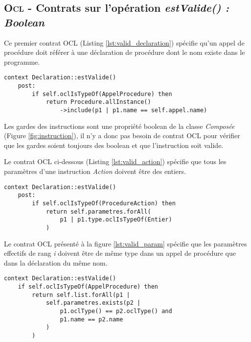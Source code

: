 
\subsection{\textsc{Ocl} - Contrats sur l'opération \emph{estValide() : Boolean}}
\label{sec:question14}

Ce premier contrat OCL (Listing \ref{lst:valid_declaration}) spécifie qu'un appel de procédure doit référer à une déclaration de procédure dont le nom existe dans le programme.

\begin{lstlisting}[caption=Contrat sur l'existance du nom de la procédure appellée,captionpos=b,label={lst:valid_declaration},language=OCL]
context Declaration::estValide()
	post:
		if self.oclIsTypeOf(AppelProcedure) then
			return Procedure.allInstance()
				->include(p1 | p1.name == self.appel.name)
\end{lstlisting}

Les gardes des instructions sont une propriété boolean de la classe \emph{Composée} (Figure \ref{fig:instruction}), il n'y a donc pas besoin de contrat OCL pour vérifier que les gardes soient toujours des boolean et que l'instruction soit valide.

Le contrat OCL ci-dessous (Listing \ref{lst:valid_action}) spécifie que tous les paramètres d'une instruction \emph{Action} doivent être des entiers.

\begin{lstlisting}[caption=Les paramètres d'une instruction \emph{Action} doivent être des entiers,captionpos=b,label={lst:valid_action},language=OCL]
context Declaration::estValide()
	post:
		if self.oclIsTypeOf(ProcedureAction) then
			return self.parametres.forAll(
				p1 | p1.type.oclIsTypeOf(Entier)
			)
\end{lstlisting}


Le contrat OCL présenté à la figure \ref{lst:valid_param} spécifie que les paramètres effectifs de rang \emph{i} doivent être de même type dans un appel de procédure que dans la déclaration du même nom.

\begin{lstlisting}[caption=Contrat OCL indiquant que les paramètres effectifs doivent être de même type que dans la déclaration,captionpos=b,label={lst:valid_param},language=OCL]
context Declaration::estValide()
	if self.oclIsTypeOf(AppelProcedure) then
		return self.list.forAll(p1 |
			self.parametres.exists(p2 |
				p1.oclType() == p2.oclType() and
				p1.name == p2.name
			)
		)	
\end{lstlisting}

